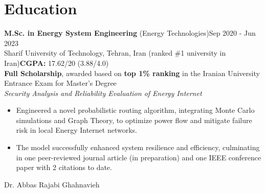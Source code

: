\documentclass[letter,20pt]{article}
\begin{document}
\section{\textbf{Education}}
\vspace{5pt}

{\fontsize{9}{12}\selectfont %

\textbf {M.Sc. in Energy System Engineering} (Energy Technologies)\hfill {\footnotesize Sep 2020 - Jun 2023}\\\vspace{5pt}
\hspace{10pt}Sharif University of Technology, Tehran, Iran (ranked \#1 university in Iran)\hfill \hspace{10pt}\footnotesize \textbf{CGPA:} 17.62/20 (3.88/4.0)\vspace{3pt}\\
\hspace{10pt}\textbf{Full Scholarship}, awarded based on \textbf{top 1\% ranking} in the Iranian University Entrance Exam for Master's Degree\\
\fontsize{9}{12}\selectfont\hspace{10pt} \textit{Security Analysis and Reliability Evaluation of Energy Internet}\\
\fontsize{9}{12}\selectfont
\begin{itemize}[noitemsep, topsep=3pt, after=\vspace{-0.6 mm},leftmargin = 8ex,rightmargin=1ex]
\small \item \justifying Engineered a novel probabilistic routing algorithm, integrating Monte Carlo simulations and Graph Theory, to optimize power flow and mitigate failure risk in local Energy Internet networks.\\
\small \item \justifying The model successfully enhanced system resilience and efficiency, culminating in one peer-reviewed journal article (in preparation) and one IEEE conference paper with 2 citations to date.
\end{itemize}
\hspace{10pt} Dr. Abbas Rajabi Ghahnavieh}\\
\vspace{10pt}
\end{document}
